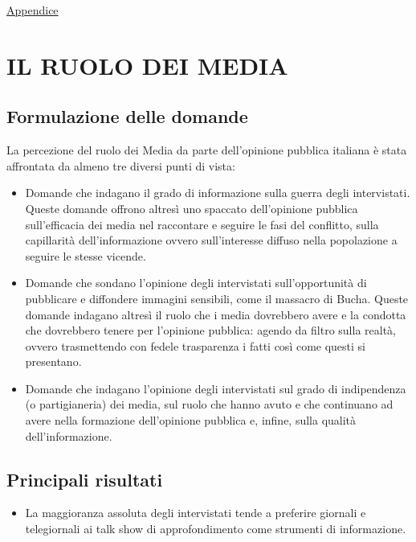 \documentclass[
]{book}
\providecommand{\tightlist}{%
  \setlength{\itemsep}{0pt}\setlength{\parskip}{0pt}}
\begin{document}
\href{https://github.com/LucianaFazio/Ucrania/blob/main/PDF_Appendice/VII.\%20Il\%20clima\%20di\%20opinione\%20v.3.pdf}{Appendice}

\hypertarget{il-ruolo-dei-media}{%
\chapter{IL RUOLO DEI MEDIA}\label{il-ruolo-dei-media}}

\hypertarget{formulazione-delle-domande-6}{%
\section{Formulazione delle domande}\label{formulazione-delle-domande-6}}

La percezione del ruolo dei Media da parte dell'opinione pubblica italiana è stata affrontata da almeno tre diversi punti di vista:

\begin{itemize}
\item
  Domande che indagano il grado di informazione sulla guerra degli intervistati. Queste domande offrono altresì uno spaccato dell'opinione pubblica sull'efficacia dei media nel raccontare e seguire le fasi del conflitto, sulla capillarità dell'informazione ovvero sull'interesse diffuso nella popolazione a seguire le stesse vicende.
\item
  Domande che sondano l'opinione degli intervistati sull'opportunità di pubblicare e diffondere immagini sensibili, come il massacro di Bucha. Queste domande indagano altresì il ruolo che i media dovrebbero avere e la condotta che dovrebbero tenere per l'opinione pubblica: agendo da filtro sulla realtà, ovvero trasmettendo con fedele trasparenza i fatti così come questi si presentano.
\item
  Domande che indagano l'opinione degli intervistati sul grado di indipendenza (o partigianeria) dei media, sul ruolo che hanno avuto e che continuano ad avere nella formazione dell'opinione pubblica e, infine, sulla qualità dell'informazione.
\end{itemize}

\hypertarget{principali-risultati-6}{%
\section{Principali risultati}\label{principali-risultati-6}}

\begin{itemize}
\tightlist
\item
  La maggioranza assoluta degli intervistati tende a preferire giornali e telegiornali ai talk show di approfondimento come strumenti di informazione.
\end{itemize}
\end{document}
